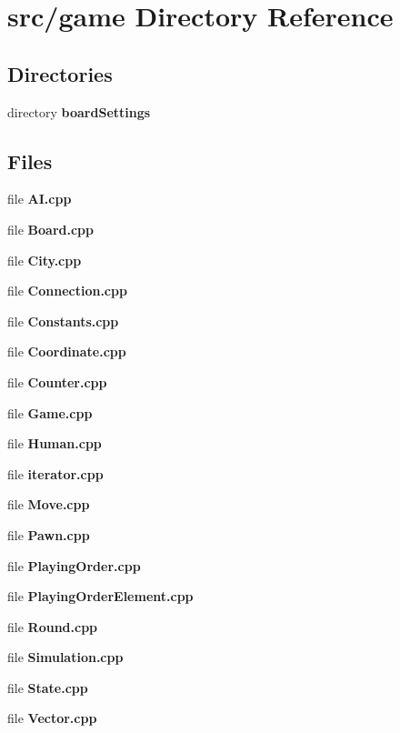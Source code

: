 \section{src/game Directory Reference}
\label{dir_1699be727a800b1d059c6f7f2b91d2ee}
\subsection*{Directories}
\begin{DoxyCompactItemize}
\item 
directory {\bf board\-Settings}
\end{DoxyCompactItemize}
\subsection*{Files}
\begin{DoxyCompactItemize}
\item 
file {\bfseries A\-I.\-cpp}
\item 
file {\bfseries Board.\-cpp}
\item 
file {\bfseries City.\-cpp}
\item 
file {\bfseries Connection.\-cpp}
\item 
file {\bfseries Constants.\-cpp}
\item 
file {\bfseries Coordinate.\-cpp}
\item 
file {\bfseries Counter.\-cpp}
\item 
file {\bfseries Game.\-cpp}
\item 
file {\bfseries Human.\-cpp}
\item 
file {\bfseries iterator.\-cpp}
\item 
file {\bfseries Move.\-cpp}
\item 
file {\bfseries Pawn.\-cpp}
\item 
file {\bfseries Playing\-Order.\-cpp}
\item 
file {\bfseries Playing\-Order\-Element.\-cpp}
\item 
file {\bfseries Round.\-cpp}
\item 
file {\bfseries Simulation.\-cpp}
\item 
file {\bfseries State.\-cpp}
\item 
file {\bfseries Vector.\-cpp}
\end{DoxyCompactItemize}

